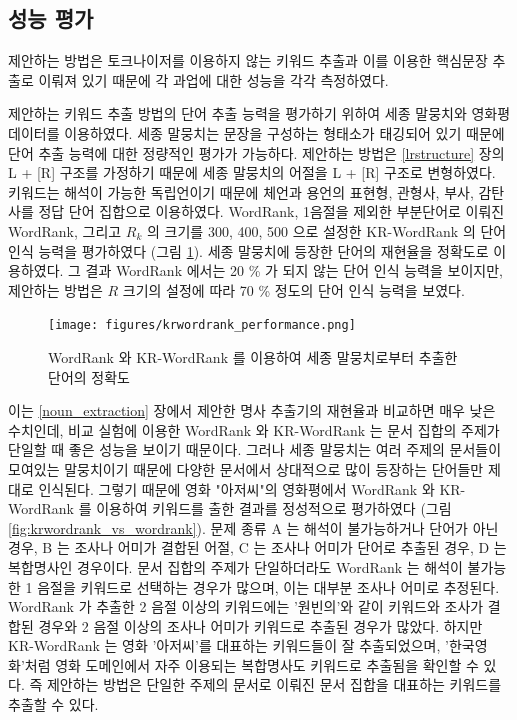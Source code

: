 \documentclass[11pt]{article}
\begin{document}
\subsection{성능 평가}

제안하는 방법은 토크나이저를 이용하지 않는 키워드 추출과 이를 이용한 핵심문장 추출로 이뤄져 있기 때문에 각 과업에 대한 성능을 각각 측정하였다.

제안하는 키워드 추출 방법의 단어 추출 능력을 평가하기 위하여 세종 말뭉치와 영화평 데이터를 이용하였다.
세종 말뭉치는 문장을 구성하는 형태소가 태깅되어 있기 때문에 단어 추출 능력에 대한 정량적인 평가가 가능하다.
제안하는 방법은 \ref{lrstructure} 장의 L + [R] 구조를 가정하기 때문에 세종 말뭉치의 어절을 L + [R] 구조로 변형하였다.
키워드는 해석이 가능한 독립언이기 때문에 체언과 용언의 표현형, 관형사, 부사, 감탄사를 정답 단어 집합으로 이용하였다.
WordRank, 1음절을 제외한 부분단어로 이뤄진 WordRank, 그리고 $R_k$ 의 크기를 300, 400, 500 으로 설정한 KR-WordRank 의 단어 인식 능력을 평가하였다 (그림 \ref{fig:krwordrank_performance}).
세종 말뭉치에 등장한 단어의 재현율을 정확도로 이용하였다.
그 결과 WordRank 에서는 20 \% 가 되지 않는 단어 인식 능력을 보이지만, 제안하는 방법은 $R$ 크기의 설정에 따라 70 \% 정도의 단어 인식 능력을 보였다.

\begin{figure}[H]
\centering
\label{fig:krwordrank_performance}
\texttt{[image: figures/krwordrank\_performance.png]}
\caption{WordRank 와 KR-WordRank 를 이용하여 세종 말뭉치로부터 추출한 단어의 정확도}
\end{figure}

이는 \ref{noun_extraction} 장에서 제안한 명사 추출기의 재현율과 비교하면 매우 낮은 수치인데, 비교 실험에 이용한 WordRank 와 KR-WordRank 는 문서 집합의 주제가 단일할 때 좋은 성능을 보이기 때문이다.
그러나 세종 말뭉치는 여러 주제의 문서들이 모여있는 말뭉치이기 때문에 다양한 문서에서 상대적으로 많이 등장하는 단어들만 제대로 인식된다.
그렇기 때문에 영화 "아저씨"의 영화평에서 WordRank 와 KR-WordRank 를 이용하여 키워드를 출한 결과를 정성적으로 평가하였다 (그림 \ref{fig:krwordrank_vs_wordrank}).
문제 종류 A 는 해석이 불가능하거나 단어가 아닌 경우, B 는 조사나 어미가 결합된 어절, C 는 조사나 어미가 단어로 추출된 경우, D 는 복합명사인 경우이다.
문서 집합의 주제가 단일하더라도 WordRank 는 해석이 불가능한 1 음절을 키워드로 선택하는 경우가 많으며, 이는 대부분 조사나 어미로 추정된다.
WordRank 가 추출한 2 음절 이상의 키워드에는 '원빈의'와 같이 키워드와 조사가 결합된 경우와 2 음절 이상의 조사나 어미가 키워드로 추출된 경우가 많았다.
하지만 KR-WordRank 는 영화 '아저씨'를 대표하는 키워드들이 잘 추출되었으며, '한국영화'처럼 영화 도메인에서 자주 이용되는 복합명사도 키워드로 추출됨을 확인할 수 있다.
즉 제안하는 방법은 단일한 주제의 문서로 이뤄진 문서 집합을 대표하는 키워드를 추출할 수 있다.
\end{document}
